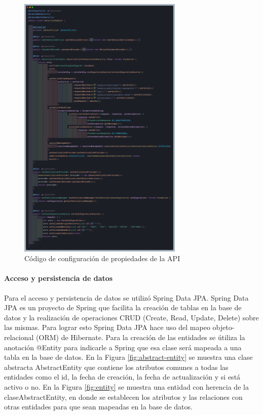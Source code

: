 \begin{figure}[H]
    \centering
    \includegraphics[width=0.7\textwidth]{resources/images/security}
    \caption{Código de configuración de propiedades de la API}
    \label{fig:security}
\end{figure}

\paragraph{Acceso y persistencia de datos}

Para el acceso y persistencia de datos se utilizó Spring Data JPA.
Spring Data JPA es un proyecto de Spring que facilita la creación de tablas en la base de datos y la realización de operaciones CRUD (Create, Read, Update, Delete) sobre las mismas.
Para lograr esto Spring Data JPA hace uso del mapeo objeto-relacional (ORM) de Hibernate.
\bigbreak
Para la creación de las entidades se útiliza la anotación @Entity para indicarle a Spring que esa clase será mapeada a una tabla en la base de datos.
En la Figura \ref{fig:abstract-entity} se muestra una clase abstracta AbstractEntity que contiene los atributos comunes a todas las entidades como el id, la fecha de creación, la fecha de actualización y si está activo o no.
En la Figura \ref{fig:entity} se muestra una entidad con herencia de la claseAbstractEntity, en donde se establecen los atributos y las relaciones con otras entidades para que sean mapeadas en la base de datos.

